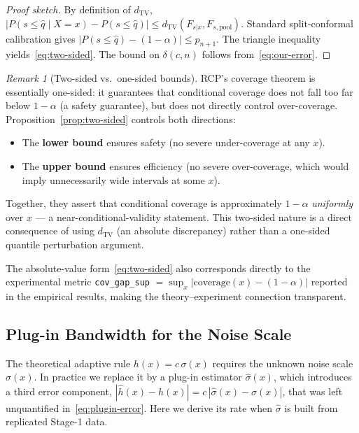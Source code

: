 \documentclass[11pt]{article}
\theoremstyle{remark}
\newtheorem{remark}[theorem]{Remark}
\begin{document}
\begin{proof}[Proof sketch]
By definition of $d_{\mathrm{TV}}$,
$|P(s \le \hat{q} \mid X=x) - P(s \le \hat{q})| \le
d_{\mathrm{TV}}(F_{s|x}, F_{s,\mathrm{pool}})$.
Standard split-conformal calibration gives
$|P(s \le \hat{q}) - (1 - \alpha)| \le p_{n+1}$.
The triangle inequality yields~\eqref{eq:two-sided}.
The bound on $\delta(c,n)$ follows from~\eqref{eq:our-error}.
\end{proof}

\begin{remark}[Two-sided vs.\ one-sided bounds]
\label{rem:two-sided}
RCP's coverage theorem is essentially one-sided: it guarantees that
conditional coverage does not fall too far below $1 - \alpha$
(a safety guarantee), but does not directly control over-coverage.
Proposition~\ref{prop:two-sided} controls both directions:
\begin{itemize}
  \item The \textbf{lower bound} ensures safety (no severe
    under-coverage at any $x$).
  \item The \textbf{upper bound} ensures efficiency (no severe
    over-coverage, which would imply unnecessarily wide intervals
    at some $x$).
\end{itemize}
Together, they assert that conditional coverage is approximately
$1 - \alpha$ \emph{uniformly} over $x$ --- a near-conditional-validity
statement. This two-sided nature is a direct consequence of using
$d_{\mathrm{TV}}$ (an absolute discrepancy) rather than a one-sided
quantile perturbation argument.

The absolute-value form~\eqref{eq:two-sided} also corresponds
directly to the experimental metric \texttt{cov\_gap\_sup}
$= \sup_x |\text{coverage}(x) - (1-\alpha)|$ reported in the
empirical results, making the theory--experiment connection
transparent.
\end{remark}

\subsection{Plug-in Bandwidth for the Noise Scale}
\label{sec:plugin-rate}

The theoretical adaptive rule $h(x) = c\,\sigma(x)$ requires the
unknown noise scale $\sigma(x)$. In practice we replace it by a
plug-in estimator $\hat\sigma(x)$, which introduces a third error
component, $|\hat h(x) - h(x)| = c\,|\hat\sigma(x)-\sigma(x)|$, that
was left unquantified in~\eqref{eq:plugin-error}. Here we derive
its rate when $\hat\sigma$ is built from replicated Stage-1 data.
\end{document}
